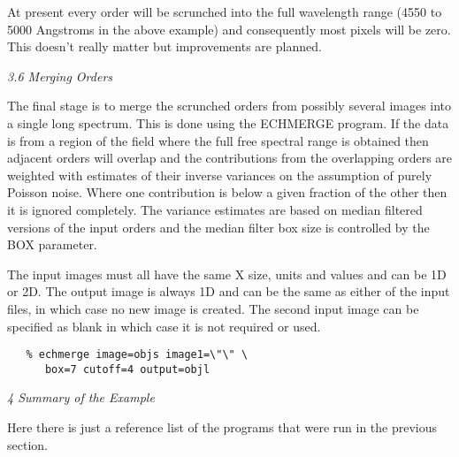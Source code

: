 At present every order will be scrunched into the full wavelength range
(4550 to 5000 Angstroms in the above example) and consequently most pixels
will be zero. This doesn't really matter but improvements are planned.


\goodbreak
\vspace{12pt}
{\it 3.6 Merging Orders}

The final stage is to merge the scrunched orders from possibly several images
into a single long spectrum. This is done using the ECHMERGE program. If the
data is from a region of the field where the full free spectral range is
obtained then adjacent orders will overlap and the contributions from the
overlapping orders are weighted with estimates of their inverse variances on
the assumption of purely Poisson noise. Where one contribution is below a given
fraction of the other then it is ignored completely. The variance estimates are
based on median filtered versions of the input orders and the median filter box
size is controlled by the BOX parameter.

The input images must all have the same X size, units and values and can be 1D
or 2D. The output image is always 1D and can be the same as either of the input
files, in which case no new image is created. The second input image can be
specified as blank in which case it is not required or used.

\begin{verbatim}
   % echmerge image=objs image1=\"\" \
      box=7 cutoff=4 output=objl
\end{verbatim}


\goodbreak
\vspace{12pt}
{\it 4 Summary of the Example}

Here there is just a reference list of the programs that were run in the
previous section.

